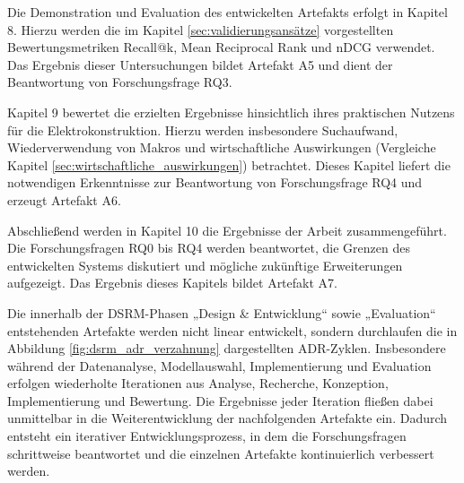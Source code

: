 Die Demonstration und Evaluation des entwickelten Artefakts erfolgt in Kapitel 8. Hierzu werden die im Kapitel \ref{sec:validierungsansätze} vorgestellten Bewertungsmetriken Recall@k, Mean Reciprocal Rank und nDCG verwendet. 
Das Ergebnis dieser Untersuchungen bildet Artefakt A5 und dient der Beantwortung von Forschungsfrage RQ3. 

Kapitel 9 bewertet die erzielten Ergebnisse hinsichtlich ihres praktischen Nutzens für die Elektrokonstruktion. Hierzu werden insbesondere Suchaufwand, Wiederverwendung von Makros und wirtschaftliche Auswirkungen (Vergleiche Kapitel \ref{sec:wirtschaftliche_auswirkungen}) betrachtet. 
Dieses Kapitel liefert die notwendigen Erkenntnisse zur Beantwortung von Forschungsfrage RQ4 und erzeugt Artefakt A6. 

Abschließend werden in Kapitel 10 die Ergebnisse der Arbeit zusammengeführt. Die Forschungsfragen RQ0 bis RQ4 werden beantwortet, die Grenzen des entwickelten Systems diskutiert und mögliche zukünftige Erweiterungen aufgezeigt. 
Das Ergebnis dieses Kapitels bildet Artefakt A7.

Die innerhalb der DSRM-Phasen „Design \& Entwicklung“ sowie „Evaluation“ entstehenden Artefakte werden nicht linear entwickelt, sondern durchlaufen die in Abbildung \ref{fig:dsrm_adr_verzahnung} dargestellten ADR-Zyklen. 
Insbesondere während der Datenanalyse, Modellauswahl, Implementierung und Evaluation erfolgen wiederholte Iterationen aus Analyse, Recherche, Konzeption, Implementierung und Bewertung. 
Die Ergebnisse jeder Iteration fließen dabei unmittelbar in die Weiterentwicklung der nachfolgenden Artefakte ein. Dadurch entsteht ein iterativer Entwicklungsprozess, 
in dem die Forschungsfragen schrittweise beantwortet und die einzelnen Artefakte kontinuierlich verbessert werden.
